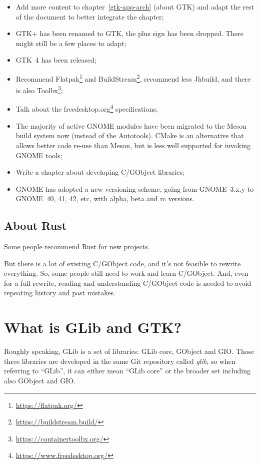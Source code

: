 \begin{itemize}
  \item Add more content to chapter~\ref{gtk-app-arch} (about GTK) and adapt the rest of the document to better integrate the chapter;
  \item GTK+ has been renamed to GTK, the plus sign has been dropped. There might still be a few places to adapt;
  \item GTK~4 has been released;
  \item Recommend Flatpak\footnote{\url{https://flatpak.org/}} and BuildStream\footnote{\url{https://buildstream.build/}}, recommend less Jhbuild, and there is also Toolbx\footnote{\url{https://containertoolbx.org/}};
  \item Talk about the freedesktop.org\footnote{\url{https://www.freedesktop.org/}} specifications;
  \item The majority of active GNOME modules have been migrated to the Meson build system now (instead of the Autotools). CMake is an alternative that allows better code re-use than Meson, but is less well supported for invoking GNOME tools;
  \item Write a chapter about developing C/GObject libraries;
  \item GNOME has adopted a new versioning scheme, going from GNOME~3.x.y to GNOME~40, 41, 42, etc, with alpha, beta and rc versions.
\end{itemize}

\subsection{About Rust}

Some people recommend Rust for new projects.

But there is a lot of existing C/GObject code, and it's not feasible to rewrite everything. So, some people still need to work and learn C/GObject. And, even for a full rewrite, reading and understanding C/GObject code is needed to avoid repeating history and past mistakes.

\section{What is GLib and GTK?}

Roughly speaking, GLib is a set of libraries: GLib core, GObject and GIO. Those three libraries are developed in the same Git repository called \emph{glib}, so when referring to ``GLib'', it can either mean ``GLib core'' or the broader set including also GObject and GIO.

